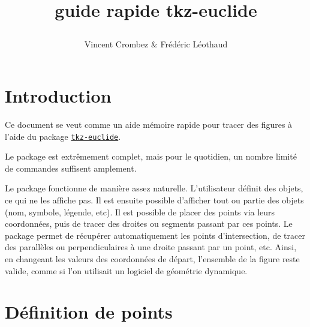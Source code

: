 \documentclass[fiche]{classe-tex3R}
\title{\bfseries guide rapide tkz-euclide\par}
\author{Vincent Crombez \& Frédéric Léothaud}
\date{}
\begin{document}
\maketitle

\newpage

\tableofcontents

\newpage

{}
\section*{Introduction}

Ce document se veut comme un aide mémoire rapide pour tracer des figures à l'aide du package \href{https://texlive.mycozy.space/macros/latex/contrib/tkz/tkz-euclide/doc/tkz-euclide.pdf}{\texttt{tkz-euclide}}.

Le package est extrêmement complet, mais pour le quotidien, un nombre limité de commandes suffisent amplement.

Le package fonctionne de manière assez naturelle. L'utilisateur définit des objets, ce qui ne les affiche pas. Il est ensuite possible d'afficher tout ou partie des objets (nom, symbole, légende, etc). Il est possible de placer des points via leurs coordonnées, puis de tracer des droites ou segments passant par ces points. Le package permet de récupérer automatiquement les points d'intersection, de tracer des parallèles ou perpendiculaires à une droite passant par un point, etc. Ainsi, en changeant les valeurs des coordonnées de départ, l'ensemble de la figure reste valide, comme si l'on utilisait un logiciel de géométrie dynamique.


\section{Définition de points}


\hfill%
%
\end{document}
